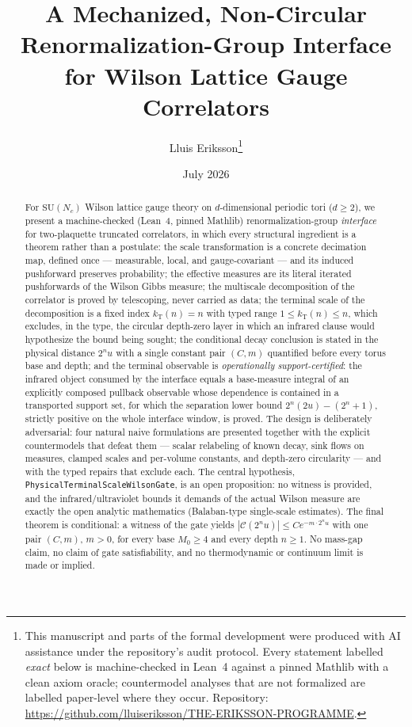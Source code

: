 \documentclass[11pt]{article}
\title{A Mechanized, Non-Circular Renormalization-Group Interface\\
for Wilson Lattice Gauge Correlators}
\author{Lluis Eriksson\thanks{This manuscript and parts of the formal
development were produced with AI assistance under the repository's
audit protocol.  Every statement labelled \emph{exact} below is
machine-checked in Lean~4 against a pinned Mathlib with a clean axiom
oracle; countermodel analyses that are not formalized are labelled
paper-level where they occur.  Repository:
\url{https://github.com/lluiseriksson/THE-ERIKSSON-PROGRAMME}.}}
\date{July 2026}
\theoremstyle{definition}
\newcommand{\lean}[1]{\texttt{#1}}
\newcommand{\SU}{\mathrm{SU}}
\newcommand{\Cov}{\mathcal{C}}
\newcommand{\kT}{k_{\mathrm{T}}}
\begin{document}
\maketitle

\begin{abstract}
For $\SU(N_c)$ Wilson lattice gauge theory on $d$-dimensional periodic
tori ($d \ge 2$), we present a machine-checked (Lean~4, pinned Mathlib)
renormalization-group \emph{interface} for two-plaquette truncated
correlators, in which every structural ingredient is a theorem rather
than a postulate: the scale transformation is a concrete decimation
map, defined once --- measurable, local, and gauge-covariant ---
and its induced pushforward preserves probability; the effective
measures are its literal iterated
pushforwards of the Wilson Gibbs measure; the multiscale decomposition
of the correlator is proved by telescoping, never carried as data; the
terminal scale of the decomposition is a fixed index $\kT(n) = n$ with
typed range $1 \le \kT(n) \le n$, which excludes, in the type, the
circular depth-zero layer in which an infrared clause would hypothesize
the bound being sought; the conditional decay conclusion is stated in
the physical distance $2^n u$ with a single constant pair $(C, m)$
quantified before every torus base and depth; and the terminal
observable is \emph{operationally support-certified}: the infrared
object consumed by the interface equals a base-measure integral of an
explicitly composed pullback observable whose dependence is contained
in a transported support set, for which the separation lower bound
$2^n(2u) - (2^n + 1)$, strictly positive on the whole interface window,
is proved.  The design is deliberately adversarial: four natural naive
formulations are presented together with the explicit countermodels
that defeat them --- scalar relabeling of known decay, sink flows on
measures, clamped scales and per-volume constants, and depth-zero
circularity --- and with the typed repairs that exclude each.  The
central hypothesis, \lean{PhysicalTerminalScaleWilsonGate}, is an open
proposition: no witness is provided, and the infrared/ultraviolet
bounds it demands of the actual Wilson measure are exactly the open
analytic mathematics (Balaban-type single-scale estimates).  The final
theorem is conditional: a witness of the gate yields
$|\Cov(2^n u)| \le C e^{-m \cdot 2^n u}$ with one pair $(C, m)$,
$m > 0$, for every base $M_0 \ge 4$ and every depth $n \ge 1$.  No
mass-gap claim, no claim of gate satisfiability, and no thermodynamic
or continuum limit is made or implied.
\end{abstract}
\end{document}
